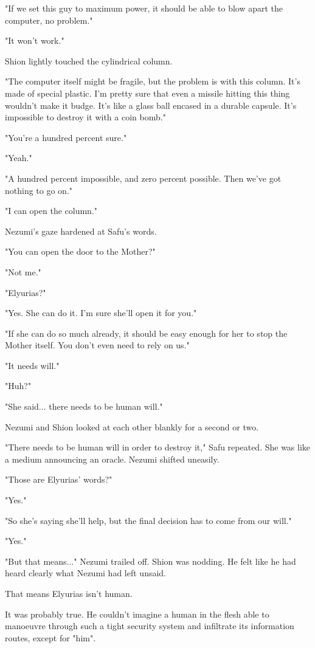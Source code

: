 "If we set this guy to maximum power, it should be able to blow apart
the computer, no problem."

"It won't work."

Shion lightly touched the cylindrical column.

"The computer itself might be fragile, but the problem is with this
column. It's made of special plastic. I'm pretty sure that even a
missile hitting this thing wouldn't make it budge. It's like a glass
ball encased in a durable capsule. It's impossible to destroy it with a
coin bomb."

"You're a hundred percent sure."

"Yeah."

"A hundred percent impossible, and zero percent possible. Then we've got
nothing to go on."

"I can open the column."

Nezumi's gaze hardened at Safu's words.

"You can open the door to the Mother?"

"Not me."

"Elyurias?"

"Yes. She can do it. I'm sure she'll open it for you."

"If she can do so much already, it should be easy enough for her to stop
the Mother itself. You don't even need to rely on us."

"It needs will."

"Huh?"

"She said... there needs to be human will."

Nezumi and Shion looked at each other blankly for a second or two.

"There needs to be human will in order to destroy it," Safu repeated.
She was like a medium announcing an oracle. Nezumi shifted uneasily.

"Those are Elyurias' words?"

"Yes."

"So she's saying she'll help, but the final decision has to come from
our will."

"Yes."

"But that means..." Nezumi trailed off. Shion was nodding. He felt like
he had heard clearly what Nezumi had left unsaid.

That means Elyurias isn't human.

It was probably true. He couldn't imagine a human in the flesh able to
manoeuvre through such a tight security system and infiltrate its
information routes, except for "him".

